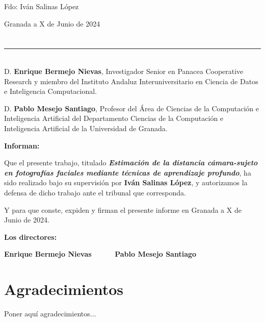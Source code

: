 \vspace{6cm}

\noindent Fdo: Iván Salinas López

\vspace{2cm}

\begin{flushright}
Granada a X de Junio de 2024
\end{flushright}


\chapter*{}
\thispagestyle{empty}

\noindent\rule[-1ex]{\textwidth}{2pt}\\[4.5ex]

D. \textbf{Enrique Bermejo Nievas}, Investigador Senior en Panacea Cooperative Research y miembro del Instituto Andaluz Interuniversitario en Ciencia de Datos e Inteligencia Computacional.

\vspace{0.5cm}

D. \textbf{Pablo Mesejo Santiago}, Profesor del Área de Ciencias de la Computación e Inteligencia Artificial del Departamento Ciencias de la Computación e Inteligencia Artificial de la Universidad de Granada.


\vspace{0.5cm}

\textbf{Informan:}

\vspace{0.5cm}

Que el presente trabajo, titulado \textit{\textbf{Estimación de la distancia cámara-sujeto en fotografías faciales mediante técnicas de aprendizaje profundo}}, ha sido realizado bajo su supervisión por \textbf{Iván Salinas López}, y autorizamos la defensa de dicho trabajo ante el tribunal
que corresponda.

\vspace{0.5cm}

Y para que conste, expiden y firman el presente informe en Granada a X de Junio de 2024.

\vspace{1cm}

\textbf{Los directores:}

\vspace{5cm}

\noindent \textbf{Enrique Bermejo Nievas \ \ \ \ \ Pablo Mesejo Santiago}

\chapter*{Agradecimientos}
\thispagestyle{empty}

       \vspace{1cm}


Poner aquí agradecimientos...

